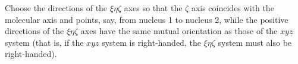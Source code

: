 Choose the directions of the $\xi\eta\zeta$ axes so that the $\zeta$ axis coincides with the molecular axis and points, say, from nucleus 1 to nucleus 2, while the positive directions of the $\xi\eta\zeta$ axes have the same mutual orientation as those of the $xyz$ system (that is, if the $xyz$ system is right-handed, the $\xi\eta\zeta$ system must also be right-handed).
